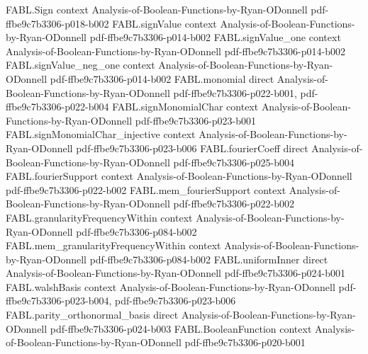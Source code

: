 \begin{theorem}
\label{FABL.fourierCoeff_eq_of_card_eq_of_isSymmetric}
\leanok
{}
\proofstep
  {FABL.Sign}
  {context}
  {Analysis-of-Boolean-Functions-by-Ryan-ODonnell}
  {pdf-ffbe9c7b3306-p018-b002}
\proofstep
  {FABL.signValue}
  {context}
  {Analysis-of-Boolean-Functions-by-Ryan-ODonnell}
  {pdf-ffbe9c7b3306-p014-b002}
\proofstep
  {FABL.signValue_one}
  {context}
  {Analysis-of-Boolean-Functions-by-Ryan-ODonnell}
  {pdf-ffbe9c7b3306-p014-b002}
\proofstep
  {FABL.signValue_neg_one}
  {context}
  {Analysis-of-Boolean-Functions-by-Ryan-ODonnell}
  {pdf-ffbe9c7b3306-p014-b002}
\proofstep
  {FABL.monomial}
  {direct}
  {Analysis-of-Boolean-Functions-by-Ryan-ODonnell}
  {pdf-ffbe9c7b3306-p022-b001,
    pdf-ffbe9c7b3306-p022-b004}
\proofstep
  {FABL.signMonomialChar}
  {context}
  {Analysis-of-Boolean-Functions-by-Ryan-ODonnell}
  {pdf-ffbe9c7b3306-p023-b001}
\proofstep
  {FABL.signMonomialChar_injective}
  {context}
  {Analysis-of-Boolean-Functions-by-Ryan-ODonnell}
  {pdf-ffbe9c7b3306-p023-b006}
\proofstep
  {FABL.fourierCoeff}
  {direct}
  {Analysis-of-Boolean-Functions-by-Ryan-ODonnell}
  {pdf-ffbe9c7b3306-p025-b004}
\proofstep
  {FABL.fourierSupport}
  {context}
  {Analysis-of-Boolean-Functions-by-Ryan-ODonnell}
  {pdf-ffbe9c7b3306-p022-b002}
\proofstep
  {FABL.mem_fourierSupport}
  {context}
  {Analysis-of-Boolean-Functions-by-Ryan-ODonnell}
  {pdf-ffbe9c7b3306-p022-b002}
\proofstep
  {FABL.granularityFrequencyWithin}
  {context}
  {Analysis-of-Boolean-Functions-by-Ryan-ODonnell}
  {pdf-ffbe9c7b3306-p084-b002}
\proofstep
  {FABL.mem_granularityFrequencyWithin}
  {context}
  {Analysis-of-Boolean-Functions-by-Ryan-ODonnell}
  {pdf-ffbe9c7b3306-p084-b002}
\proofstep
  {FABL.uniformInner}
  {direct}
  {Analysis-of-Boolean-Functions-by-Ryan-ODonnell}
  {pdf-ffbe9c7b3306-p024-b001}
\proofstep
  {FABL.walshBasis}
  {context}
  {Analysis-of-Boolean-Functions-by-Ryan-ODonnell}
  {pdf-ffbe9c7b3306-p023-b004,
    pdf-ffbe9c7b3306-p023-b006}
\proofstep
  {FABL.parity_orthonormal_basis}
  {direct}
  {Analysis-of-Boolean-Functions-by-Ryan-ODonnell}
  {pdf-ffbe9c7b3306-p024-b003}
\proofstep
  {FABL.BooleanFunction}
  {context}
  {Analysis-of-Boolean-Functions-by-Ryan-ODonnell}
  {pdf-ffbe9c7b3306-p020-b001}

\end{theorem}
